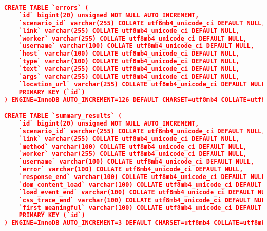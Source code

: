 \begin{lstlisting}[frame=single,tabsize=2,breaklines,caption={Basis data MySQL},label=mysql, captionpos=b, language=json]
CREATE TABLE `errors` (
	`id` bigint(20) unsigned NOT NULL AUTO_INCREMENT,
	`scenario_id` varchar(255) COLLATE utf8mb4_unicode_ci DEFAULT NULL,
	`link` varchar(255) COLLATE utf8mb4_unicode_ci DEFAULT NULL,
	`worker` varchar(255) COLLATE utf8mb4_unicode_ci DEFAULT NULL,
	`username` varchar(100) COLLATE utf8mb4_unicode_ci DEFAULT NULL,
	`host` varchar(100) COLLATE utf8mb4_unicode_ci DEFAULT NULL,
	`type` varchar(100) COLLATE utf8mb4_unicode_ci DEFAULT NULL,
	`text` varchar(255) COLLATE utf8mb4_unicode_ci DEFAULT NULL,
	`args` varchar(255) COLLATE utf8mb4_unicode_ci DEFAULT NULL,
	`location_url` varchar(255) COLLATE utf8mb4_unicode_ci DEFAULT NULL,
	PRIMARY KEY (`id`)
) ENGINE=InnoDB AUTO_INCREMENT=126 DEFAULT CHARSET=utf8mb4 COLLATE=utf8mb4_unicode_ci;

CREATE TABLE `summary_results` (
	`id` bigint(20) unsigned NOT NULL AUTO_INCREMENT,
	`scenario_id` varchar(255) COLLATE utf8mb4_unicode_ci DEFAULT NULL,
	`link` varchar(255) COLLATE utf8mb4_unicode_ci DEFAULT NULL,
	`method` varchar(100) COLLATE utf8mb4_unicode_ci DEFAULT NULL,
	`worker` varchar(255) COLLATE utf8mb4_unicode_ci DEFAULT NULL,
	`username` varchar(100) COLLATE utf8mb4_unicode_ci DEFAULT NULL,
	`error` varchar(100) COLLATE utf8mb4_unicode_ci DEFAULT NULL,
	`response_end` varchar(100) COLLATE utf8mb4_unicode_ci DEFAULT NULL,
	`dom_content_load` varchar(100) COLLATE utf8mb4_unicode_ci DEFAULT NULL,
	`load_event_end` varchar(100) COLLATE utf8mb4_unicode_ci DEFAULT NULL,
	`css_trace_end` varchar(100) COLLATE utf8mb4_unicode_ci DEFAULT NULL,
	`first_meaningful` varchar(100) COLLATE utf8mb4_unicode_ci DEFAULT NULL,
	PRIMARY KEY (`id`)
) ENGINE=InnoDB AUTO_INCREMENT=3 DEFAULT CHARSET=utf8mb4 COLLATE=utf8mb4_unicode_ci;
\end{lstlisting}